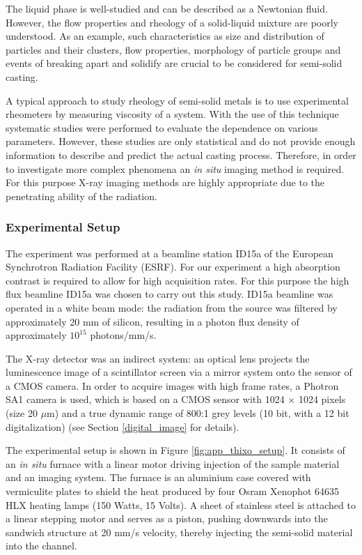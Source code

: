 The liquid phase is well-studied and can be described as a Newtonian fluid. However, the flow properties and rheology of a solid-liquid mixture are poorly understood. As an example, such characteristics as size and distribution of particles and their clusters, flow properties, morphology of particle groups and events of breaking apart and solidify are crucial to be considered for semi-solid casting.  

A typical approach to study rheology of semi-solid metals is to use experimental rheometers by measuring viscosity of a system. With the use of this technique systematic studies were performed to evaluate the dependence on various parameters.  However, these studies are only statistical and do not provide enough information to describe and predict the actual casting process. 
Therefore, in order to investigate more complex phenomena an \textit{in situ} imaging method is required. For this purpose  X-ray imaging
methods are highly appropriate due to the penetrating
ability of the radiation.






\subsubsection{Experimental Setup}

The experiment was performed at a beamline station ID15a of the European Synchrotron Radiation Facility (ESRF). For our experiment a high absorption contrast is required to allow for high acquisition rates. For this purpose the high flux beamline ID15a was chosen to carry out this study.
ID15a beamline was operated in a white beam mode: the radiation from the source was filtered by approximately 20 mm of silicon, resulting in a photon flux density of approximately $10^{15}$ photons/mm/s.

The X-ray detector was an indirect system: an optical lens projects the luminescence image of a scintillator screen via a mirror system onto the sensor of a CMOS camera.  In order to acquire images with high frame rates, a Photron SA1 camera is used, which is based on a CMOS
sensor with 1024 $\times$ 1024 pixels (size 20 $\mu$m) and a true dynamic range of 800:1 grey levels (10 bit, with a 12 bit digitalization) (see Section \ref{digital_image} for details).

The experimental setup is shown in Figure \ref{fig:app_thixo_setup}.
It consists of an \textit{in situ} furnace with a linear motor driving injection of the sample material and an imaging system. The furnace is an
aluminium case covered with vermiculite plates to shield the heat 
produced by four Osram Xenophot 64635 HLX heating lamps (150 Watts, 15 Volts). A sheet of stainless steel is attached to a linear stepping motor and serves as a piston, pushing downwards into the sandwich structure at 20 mm/s velocity,
thereby injecting the semi-solid material into the channel.

